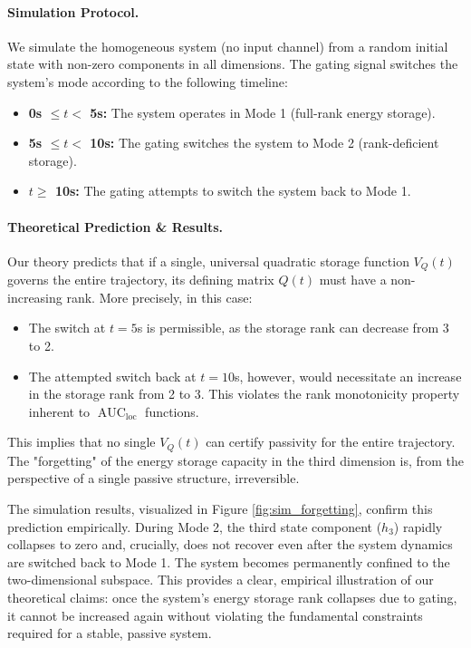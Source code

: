 \documentclass[10pt]{article} %
\newcommand{\loc}{\mathrm{loc}}                         %
\DeclareMathOperator{\AUC}{AUC}                         %
\theoremstyle{definition}
\begin{document}
\paragraph{Simulation Protocol.}
We simulate the homogeneous system (no input channel) from a random initial state with non-zero components in all dimensions. The gating signal switches the system's mode according to the following timeline:
\begin{itemize}
    \item \textbf{0s $\le t <$ 5s:} The system operates in Mode 1 (full-rank energy storage).
    \item \textbf{5s $\le t <$ 10s:} The gating switches the system to Mode 2 (rank-deficient storage).
    \item \textbf{$t \ge$ 10s:} The gating attempts to switch the system back to Mode 1.
\end{itemize}

\paragraph{Theoretical Prediction \& Results.}
Our theory predicts that if a single, universal quadratic storage function $V_Q(t)$ governs the entire trajectory, its defining matrix $Q(t)$ must have a non-increasing rank. More precisely, in this case:
\begin{itemize}
    \item The switch at $t=5$s is permissible, as the storage rank can decrease from 3 to 2.
    \item The attempted switch back at $t=10$s, however, would necessitate an increase in the storage rank from 2 to 3. This violates the rank monotonicity property inherent to $\AUC_\loc$ functions.
\end{itemize}
This implies that no single $V_Q(t)$ can certify passivity for the entire trajectory. The "forgetting" of the energy storage capacity in the third dimension is, from the perspective of a single passive structure, irreversible.

The simulation results, visualized in Figure \ref{fig:sim_forgetting}, confirm this prediction empirically. During Mode 2, the third state component ($h_3$) rapidly collapses to zero and, crucially, does not recover even after the system dynamics are switched back to Mode 1. The system becomes permanently confined to the two-dimensional subspace. This provides a clear, empirical illustration of our theoretical claims: once the system's energy storage rank collapses due to gating, it cannot be increased again without violating the fundamental constraints required for a stable, passive system.
\end{document}
